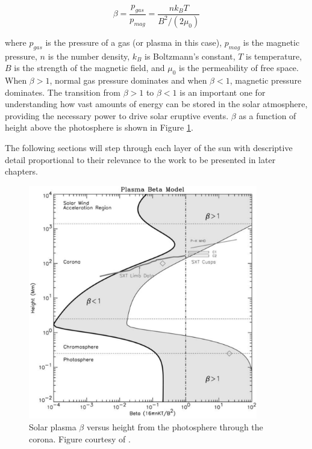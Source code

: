 \begin{equation}
    \label{eq:beta}
    \beta = \frac{p_{gas}}{p_{mag}} = \frac{nk_BT}{B^2/(2\mu_0)}
\end{equation}

\noindent where $p_{gas}$ is the pressure of a gas (or plasma in this case), $p_{mag}$ is the magnetic pressure, $n$ is the number density, $k_B$ is Boltzmann's constant, $T$ is temperature, $B$ is the strength of the magnetic field, and $\mu_0$ is the permeability of free space. When $\beta > 1$, normal gas pressure dominates and when $\beta < 1$, magnetic pressure dominates. The transition from $\beta > 1$ to $\beta < 1$ is an important one for understanding how vast amounts of energy can be stored in the solar atmosphere, providing the necessary power to drive solar eruptive events. $\beta$ as a function of height above the photosphere is shown in Figure \ref{fig:betavsheight}. 

The following sections will step through each layer of the sun with descriptive detail proportional to their relevance to the work to be presented in later chapters. 

\begin{figure}[!h]
    \begin{center}
	    \includegraphics[width=100mm]{Images/BetaVsHeight.png}
    \end{center}
    \caption[Solar Plasma $\beta$ Versus Height]{
        Solar plasma $\beta$ versus height from the photosphere through the corona. Figure courtesy of
        \citet{Gary2001}.         
    }
    \label{fig:betavsheight}
\end{figure}

